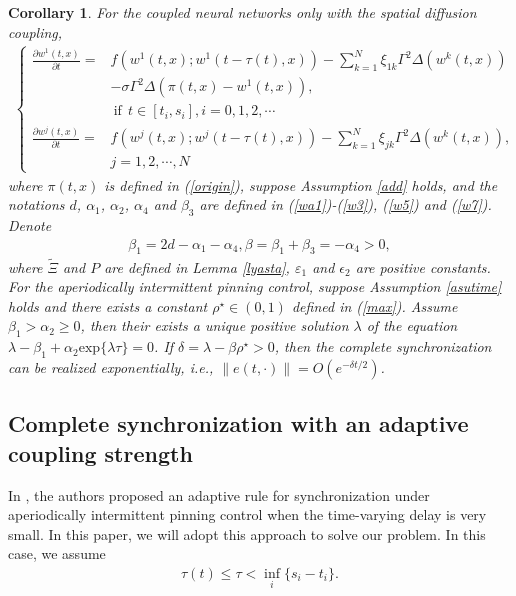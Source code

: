 \documentclass[review]{elsarticle}
\newtheorem{col}{Corollary}
\begin{document}
\begin{col}
For the coupled neural networks only with the spatial diffusion coupling,
\begin{align}\label{c-2}
\left\{
\begin{array}{cl}
\frac{\partial{w^1(t,x)}}{\partial{t}}=&f(w^1(t,x);w^1(t-\tau(t),x))-\sum\limits_{k=1}^N\xi_{1k}\Gamma^2
\Delta(w^k(t,x))\\
&-\sigma\Gamma^2 \Delta(\pi(t,x)-w^1(t,x)),\\
&~\mathrm{if}~~t\in [t_i,s_i], i=0,1,2,\cdots\\
\frac{\partial{w^j(t,x)}}{\partial{t}}=&f(w^j(t,x);w^j(t-\tau(t),x))-\sum\limits_{k=1}^N\xi_{jk}\Gamma^2
\Delta(w^k(t,x)),\\
&j=1,2,\cdots,N
\end{array}
\right.
\end{align}
where $\pi(t,x)$ is defined in (\ref{origin}), suppose Assumption \ref{add} holds, and the notations $d$, $\alpha_1$, $\alpha_2$, $\alpha_4$ and $\beta_3$ are defined in (\ref{wa1})-(\ref{w3}), (\ref{w5}) and (\ref{w7}). Denote
\begin{align*}
\beta_1=2d-\alpha_1-\alpha_4, \beta=\beta_1+\beta_3=-\alpha_4>0,
\end{align*}
where $\tilde{\Xi}$ and $P$ are defined in Lemma \ref{lyasta}, $\varepsilon_1$ and $\epsilon_2$ are positive constants. For the aperiodically intermittent pinning control, suppose Assumption \ref{asutime} holds and there exists a constant $\rho^{\star}\in (0,1)$ defined in (\ref{max}). Assume $\beta_1>\alpha_2\geq 0$, then their exists a unique positive solution $\lambda$ of the equation
$\lambda-\beta_1+\alpha_2 \mathrm{exp}\{\lambda{\tau}\}=0$.
If $\delta=\lambda-\beta\rho^{\star}>0$, then the complete synchronization can be realized exponentially, i.e., $\|e(t,\cdot)\|=O(e^{-\delta t/2})$.
\end{col}

\subsection{Complete synchronization with an adaptive coupling strength}\label{adaptive}
In \cite{LC15}, the authors proposed an adaptive rule for synchronization under aperiodically intermittent pinning control when the time-varying delay is very small. In this paper, we will adopt this approach to solve our problem. In this case, we assume
\begin{align}\label{smalltau}
\tau(t)\leq {\tau}<\inf\limits_i\{s_i-t_i\}.
\end{align}
\end{document}
